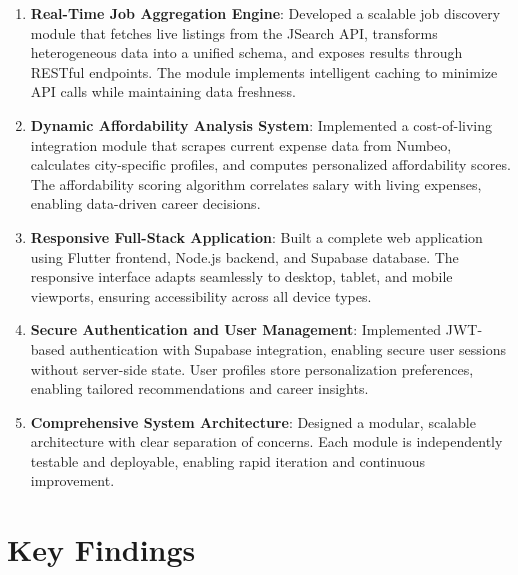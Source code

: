 \documentclass[12pt,a4paper,oneside]{report}
\begin{document}
\begin{enumerate}
    \item \textbf{Real-Time Job Aggregation Engine}: Developed a scalable job discovery module that fetches live listings from the JSearch API, transforms heterogeneous data into a unified schema, and exposes results through RESTful endpoints. The module implements intelligent caching to minimize API calls while maintaining data freshness.
    
    \item \textbf{Dynamic Affordability Analysis System}: Implemented a cost-of-living integration module that scrapes current expense data from Numbeo, calculates city-specific profiles, and computes personalized affordability scores. The affordability scoring algorithm correlates salary with living expenses, enabling data-driven career decisions.
    
    \item \textbf{Responsive Full-Stack Application}: Built a complete web application using Flutter frontend, Node.js backend, and Supabase database. The responsive interface adapts seamlessly to desktop, tablet, and mobile viewports, ensuring accessibility across all device types.
    
    \item \textbf{Secure Authentication and User Management}: Implemented JWT-based authentication with Supabase integration, enabling secure user sessions without server-side state. User profiles store personalization preferences, enabling tailored recommendations and career insights.
    
    \item \textbf{Comprehensive System Architecture}: Designed a modular, scalable architecture with clear separation of concerns. Each module is independently testable and deployable, enabling rapid iteration and continuous improvement.
\end{enumerate}

\section{Key Findings}
\end{document}
